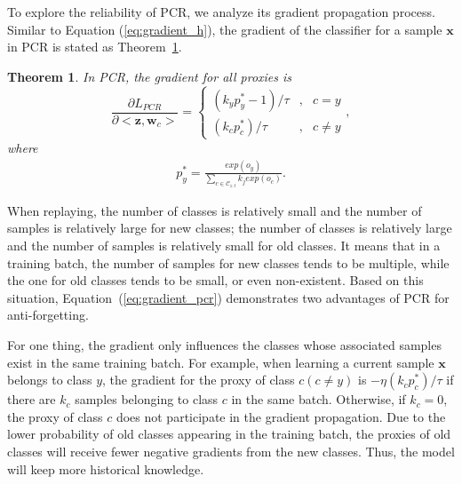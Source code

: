 To explore the reliability of PCR, we analyze its gradient propagation process. Similar to Equation (\ref{eq:gradient_h}), the gradient of the classifier for a sample $\bm{x}$ in PCR is stated as Theorem~\ref{thm1}.
\newtheorem{theorem}{\bf Theorem}
\begin{theorem}\label{thm1}
	In PCR, the gradient for all proxies is 
 \begin{equation}
    \label{eq:gradient_pcr}
    \frac{\partial L_{PCR}}{\partial <\bm{z},\bm{w}_c>}=\left\{
    \begin{aligned}
        (k_yp^*_y-1)/\tau&,&c= y \\
        (k_cp^*_c)/\tau&,&c\neq y
    \end{aligned}
    \right.,
\end{equation}
where 
\begin{equation}
\begin{split}
    p^*_y=\frac{exp(o_y)}{\sum_{c\in\mathcal{C}_{1:t}}k_j exp(o_c)}.
\end{split}
\end{equation}
\end{theorem} 
When replaying, the number of classes is relatively small and the number of samples is relatively large for new classes; the number of classes is relatively large and the number of samples is relatively small for old classes. It means that in a training batch, the number of samples for new classes tends to be multiple, while the one for old classes tends to be small, or even non-existent. Based on this situation, Equation~(\ref{eq:gradient_pcr}) demonstrates two advantages of PCR for anti-forgetting. 

For one thing, the gradient only influences the classes whose associated samples exist in the same training batch. For example, when learning a current sample $\bm{x}$ belongs to class $y$, the gradient for the proxy of class $c (c\neq y)$ is $-\eta(k_cp^*_c)/\tau$ if there are $k_c$ samples belonging to class $c$ in the same batch. Otherwise, if $k_c=0$, the proxy of class $c$ does not participate in the gradient propagation. Due to the lower probability of old classes appearing in the training batch, the proxies of old classes will receive fewer negative gradients from the new classes. Thus, the model will keep more historical knowledge. 

